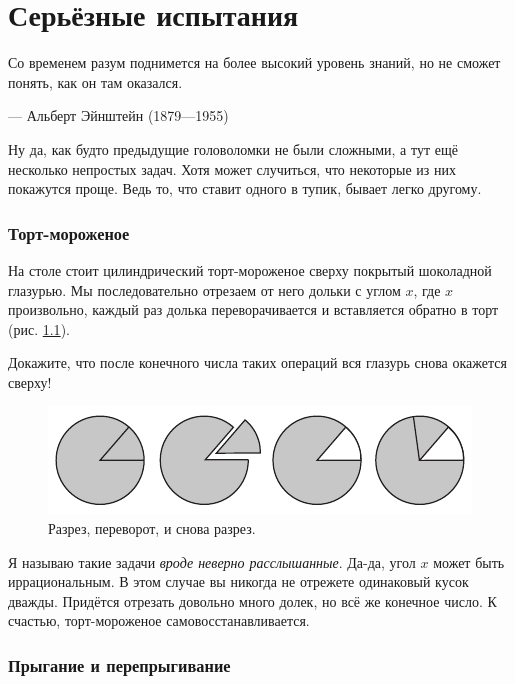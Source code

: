 \chapter{Серьёзные испытания}


\setlength{\epigraphwidth}{.80\textwidth}
\epigraph{Со временем разум поднимется на более высокий уровень знаний, но не сможет понять, как он там оказался.
}{--- Альберт Эйнштейн (1879---1955)}

Ну да, как будто предыдущие головоломки не были сложными, а тут ещё несколько непростых задач.
Хотя может случиться, что некоторые из них покажутся проще.
Ведь то, что ставит одного в тупик, бывает легко другому.


\subsection*{Торт-мороженое}\label{Торт-мороженое}

На столе стоит цилиндрический торт-мороженое сверху покрытый шоколадной глазурью.
Мы последовательно отрезаем от него дольки с углом $x$, где $x$ произвольно,
каждый раз долька переворачивается и вставляется обратно в торт
(рис. \ref{pic:tort}).

Докажите, что после конечного числа таких операций вся глазурь снова окажется сверху!


\begin{figure}[htb!]
\centering
\includegraphics[scale=1]{pics/tort}
\caption{Разрез, переворот, и снова разрез.}
\label{pic:tort}
\end{figure}

Я называю такие задачи \emph{вроде неверно расслышанные}.
Да-да, угол $x$ может быть иррациональным. 
В этом случае вы никогда не отрежете одинаковый кусок дважды.
Придётся отрезать довольно много долек, но всё же конечное число.
К счастью, торт-мороженое самовосстанавливается.

\subsection*{Прыгание и перепрыгивание}

